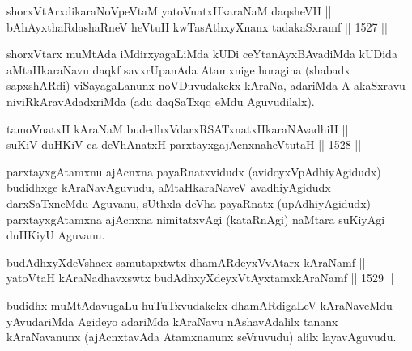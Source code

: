 

\begin{shl}
shorxVtArxdikaraNoVpeVtaM yatoV\s natxHkaraNaM daqsheVH || \\
bAhAyxthaRdashaRneV heVtuH kwTasAthxyXnanx tadakaSxramf \hfill || 1527 ||  
\end{shl}

\begin{artha}
shorxVtarx muMtAda iMdirxyagaLiMda kUDi ceYtanAyxBAvadiMda kUDida aMtaHkaraNavu daqkf savxrUpanAda Atamxnige horagina (shabadx sapxshARdi) viSayagaLanunx noVDuvudakekx kAraNa, adariMda A akaSxravu niviRkAravAdadxriMda (adu daqSaTxqq eMdu Aguvudilalx).
\end{artha}


\begin{shl}
tamoVnatxH kAraNaM budedhxVdarxRSATx\s natxHkaraNAvadhiH ||  \\
suKiV duHKiV ca deVhAnatxH parxtayxgajAcnxnaheVtutaH \hfill || 1528 ||  
\end{shl}

\begin{artha}
parxtayxgAtamxnu ajAcnxna payaRnatxvidudx (avidoyxVpAdhiyAgidudx) budidhxge kAraNavAguvudu, aMtaHkaraNaveV avadhiyAgidudx darxSaTxneMdu Aguvanu, sUthxla deVha payaRnatx (upAdhiyAgidudx) parxtayxgAtamxna ajAcnxna nimitatxvAgi (kataRnAgi) naMtara suKiyAgi duHKiyU Aguvanu.
\end{artha}


\begin{shl}
budAdhxyXdeVshacx samutapxtwtx dhamARdeyxVvAtarx kAraNamf || \\
yatoV\s taH kAraNadhavxswtx budAdhxyXdeyxVtAyxtamxkAraNamf \hfill || 1529 ||  
\end{shl}

\begin{artha}
budidhx muMtAdavugaLu huTuTxvudakekx dhamARdigaLeV kAraNaveMdu yAvudariMda Agideyo adariMda kAraNavu nAshavAdalilx tananx kAraNavanunx (ajAcnxtavAda Atamxnanunx seVruvudu) alilx layavAguvudu.
\end{artha}

